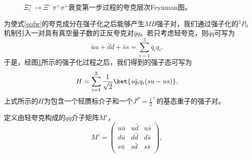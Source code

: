 \begin{figure}[h]
	\subfigure[]{
	\label{qq1}
	\begin{minipage}[t]{.5\textwidth}
	\centering
	\texttt{[image: qq1]}
	\end{minipage}}
	\subfigure[]{
	\label{qq2}
	\begin{minipage}[t]{.5\textwidth}
	\centering
	\texttt{[image: qq2]}
	\end{minipage}}
	\subfigure[]{
	\label{qq3}
	\begin{minipage}[t]{.5\textwidth}
	\centering
	\texttt{[image: qq3]}
	\end{minipage}}
	\subfigure[]{
	\label{qq4}
	\begin{minipage}[t]{.5\textwidth}
	\centering
	\texttt{[image: qq4]}
	\end{minipage}}
	\caption[夸克层次Feynman图]{$\Xi_{c}^{+}\to\Xi^{-}\pi^{+}\pi^{+}$衰变第一步过程的夸克层次Feynman图。}
\label{qqbar}
\end{figure}\par
为使式\eqref{eqfw}的夸克成分在强子化之后能够产生$MB$强子对，我们通过强子化的$^3P_{0}$机制引入一对具有真空量子数的正反夸克对$\bar{q}q$。若只考虑轻夸克，则$\bar{q}q$可写为
\begin{equation}
	\bar{u}u+\bar{d}d+\bar{s}s=\sum^{3}_{i=1}\bar{q}_{i}q_{i}.
\end{equation}
于是，经图\ref{qqbar}所示的强子化过程之后，我们得到的强子态可写为
\vspace{-0.2cm}
\begin{equation}
\label{fds}
	H=\sum_{i=1}^{3}\frac{1}{\sqrt{2}}\ket{s\bar{q}_{i}q_{i}(su-us)}.
\end{equation}
上式所示的$H$为包含一个轻赝标介子和一个$J^{P}=\frac{1}{2}^{+}$的基态重子的强子对。\par
定义由轻夸克构成的$q\bar{q}$介子矩阵$M'$，
\begin{equation}
	M'=
	\begin{pmatrix}
		u\bar{u} & u\bar{d} & u\bar{s} \\
		d\bar{u} & d\bar{d} & d\bar{s} \\
		s\bar{u} & s\bar{d} & s\bar{s} \\
	\end{pmatrix},
\end{equation}

